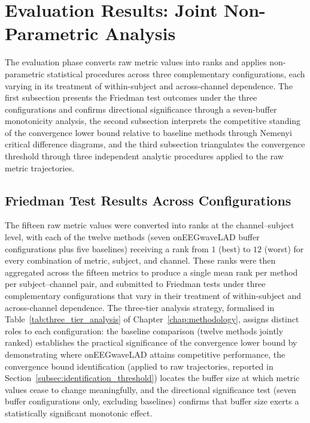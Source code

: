 \documentclass[MScCS,12pt,oneside,final]{uccthesis}
\begin{document}
\section{Evaluation Results: Joint Non-Parametric Analysis}
\label{sec:eval_results_stats}


The evaluation phase converts raw metric values into ranks and applies non-parametric statistical procedures across three complementary configurations, each varying in its treatment of within-subject and across-channel dependence. The first subsection presents the Friedman test outcomes under the three configurations and confirms directional significance through a seven-buffer monotonicity analysis, the second subsection interprets the competitive standing of the convergence lower bound relative to baseline methods through Nemenyi critical difference diagrams, and the third subsection triangulates the convergence threshold through three independent analytic procedures applied to the raw metric trajectories.

    \subsection{Friedman Test Results Across Configurations}
\label{subsec:friedman_results}

The fifteen raw metric values were converted into ranks at the channel--subject level, with each of the twelve methods (seven onEEGwaveLAD buffer configurations plus five baselines) receiving a rank from $1$ (best) to $12$ (worst) for every combination of metric, subject, and channel. These ranks were then aggregated across the fifteen metrics to produce a single mean rank per method per subject--channel pair, and submitted to Friedman tests under three complementary configurations that vary in their treatment of within-subject and across-channel dependence. The three-tier analysis strategy, formalised in Table~\ref{tab:three_tier_analysis} of Chapter~\ref{chap:methodology}, assigns distinct roles to each configuration: the baseline comparison (twelve methods jointly ranked) establishes the practical significance of the convergence lower bound by demonstrating where onEEGwaveLAD attains competitive performance, the convergence bound identification (applied to raw trajectories, reported in Section~\ref{subsec:identification_threshold}) locates the buffer size at which metric values cease to change meaningfully, and the directional significance test (seven buffer configurations only, excluding baselines) confirms that buffer size exerts a statistically significant monotonic effect.
\end{document}
